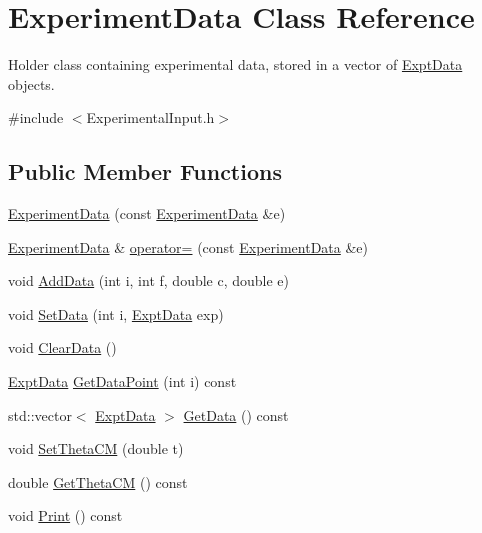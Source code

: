\hypertarget{classExperimentData}{\section{Experiment\-Data Class Reference}
\label{classExperimentData}
}


Holder class containing experimental data, stored in a vector of \hyperlink{classExptData}{Expt\-Data} objects.  




{\ttfamily \#include $<$Experimental\-Input.\-h$>$}

\subsection*{Public Member Functions}
\begin{DoxyCompactItemize}
\item 
\hyperlink{classExperimentData_a4fd4e938e3e2d3e19c764e5435adf853}{Experiment\-Data} (const \hyperlink{classExperimentData}{Experiment\-Data} \&e)
\item 
\hyperlink{classExperimentData}{Experiment\-Data} \& \hyperlink{classExperimentData_a3b9f3d2634e00fa6d1a56867ae78fb99}{operator=} (const \hyperlink{classExperimentData}{Experiment\-Data} \&e)
\item 
void \hyperlink{classExperimentData_aee3122de344975999799d74e7e7e0624}{Add\-Data} (int i, int f, double c, double e)
\item 
void \hyperlink{classExperimentData_a81531d8462a74362d35794fe05018baa}{Set\-Data} (int i, \hyperlink{classExptData}{Expt\-Data} exp)
\item 
void \hyperlink{classExperimentData_a1366e023080099fea2c8ead233e4f778}{Clear\-Data} ()
\item 
\hyperlink{classExptData}{Expt\-Data} \hyperlink{classExperimentData_aebfccd487301e728c1cb00bbe970c2bb}{Get\-Data\-Point} (int i) const 
\item 
std\-::vector$<$ \hyperlink{classExptData}{Expt\-Data} $>$ \hyperlink{classExperimentData_a99aa8a266594cf9211c5cbdd8f2c7708}{Get\-Data} () const 
\item 
void \hyperlink{classExperimentData_a00ed9f57750edbef3cc06ed1dca546d0}{Set\-Theta\-C\-M} (double t)
\item 
double \hyperlink{classExperimentData_a5ce1ebcd4abc1a9bceba0368612da008}{Get\-Theta\-C\-M} () const 
\item 
void \hyperlink{classExperimentData_a2f42d1368c3d2dd96c1cc8ecd3755325}{Print} () const 
\end{DoxyCompactItemize}


